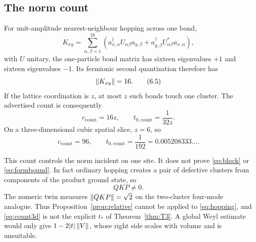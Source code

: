 \subsection{The norm count}

For unit-amplitude nearest-neighbour hopping across one bond,
\[
 K_{xy}=\sum_{\alpha,\beta=1}^{16}
 \left(a_{x,\alpha}^\dagger U_{\alpha\beta}a_{y,\beta}
 +a_{y,\beta}^\dagger U_{\alpha\beta}^*a_{x,\alpha}\right),
\tag{6.4}\label{eq:hopping}
\]
with $U$ unitary, the one-particle bond matrix has sixteen eigenvalues
$+1$ and sixteen eigenvalues $-1$.  Its fermionic second quantization
therefore has
\[
 \left\lVert K_{xy}\right\rVert=16.
\tag{6.5}\label{eq:bondnorm}
\]
If the lattice coordination is $z$, at most $z$ such bonds touch one
cluster.  The advertised count is consequently
\[
 c_{\mathrm{count}}=16z,\qquad
 t_{0,\mathrm{count}}=\frac1{32z}.
\tag{6.6}\label{eq:count}
\]
On a three-dimensional cubic spatial slice, $z=6$, so
\[
 c_{\mathrm{count}}=96,\qquad
 t_{0,\mathrm{count}}=\frac1{192}
 =0.005208333\ldots .
\tag{6.7}\label{eq:count3d}
\]

This count controls the norm incident on one site.  It does not prove
\eqref{eq:block} or \eqref{eq:formbound}.  In fact ordinary hopping
creates a pair of defective clusters from components of the product
ground state, so
\[
 QK P\ne0.
\tag{6.8}\label{eq:notblock}
\]
The numeric twin measures
$\left\lVert QKP\right\rVert=\sqrt2$ on the two-cluster four-mode analogue.  Thus
Proposition~\ref{prop:relative} cannot be applied to
\eqref{eq:hopping}, and \eqref{eq:count3d} is not the explicit
$t_*$ of Theorem~\ref{thm:T3}.  A global Weyl estimate would only give
$1-2|t|\left\lVert V\right\rVert$, whose right side scales with volume and is unsuitable.

\begin{center}
\setlength{\fboxsep}{9pt}
\end{center}

